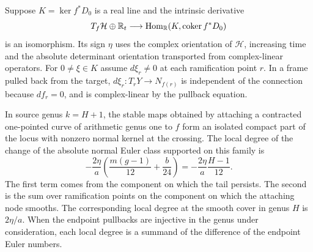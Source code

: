 Suppose $K=\ker f^*D_0$ is a real line and the intrinsic derivative
\begin{equation}\label{p9-eq:tail-core}
 T_f\mathcal H\oplus\mathbb R_t
 \longrightarrow \operatorname{Hom}_{\mathbb R}(K,\operatorname{coker} f^*D_0)
\end{equation}
is an isomorphism. Its sign $\eta$ uses the complex orientation of
$\mathcal H$, increasing time and the absolute determinant orientation
transported from complex-linear operators. For $0\ne\xi\in K$ assume
$d\xi_r\ne 0$ at each ramification point $r$. In a frame pulled back from
the target, $d\xi_r:T_rY\to N_{f(r)}$ is independent of the connection
because $df_r=0$, and is complex-linear by the pullback equation.

\begin{theorem}\label{p9-thm:tail}
In source genus $k=H+1$, the stable maps obtained by attaching a
contracted one-pointed curve of arithmetic genus one to $f$ form an
isolated compact part of the locus with nonzero normal kernel at the
crossing. The local degree of the change of the absolute normal Euler class
supported on this family is
\begin{equation}\label{p9-eq:tail-total}
 -\frac{2\eta}{a}\left(\frac{m(g-1)}{12}+\frac{b}{24}\right)
 =-\frac{2\eta}{a}\frac{H-1}{12}.
\end{equation}
The first term comes from the component on which the tail persists.
The second is the sum over ramification points on the component on
which the attaching node smooths. The corresponding local degree at the smooth cover in genus $H$ is
$2\eta/a$. When the endpoint pullbacks are injective in the genus under
consideration, each local degree is a summand of the difference of the
endpoint Euler numbers.
\end{theorem}

